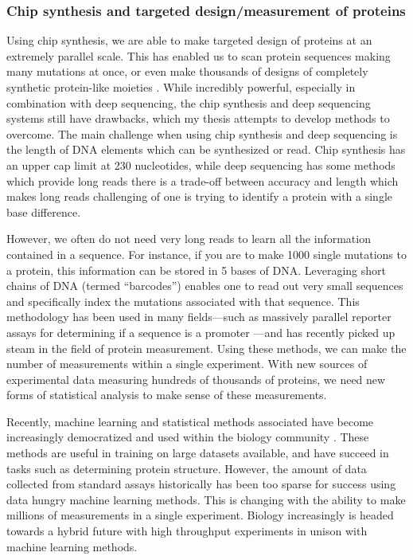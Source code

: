 \subsubsection{Chip synthesis and targeted design/measurement of proteins}
Using chip synthesis, we are able to make targeted design of proteins at an extremely parallel scale. This has enabled us to scan protein sequences making many mutations at once\cite{Starita2015-uk,Taylor2016-wr}, or even make thousands of designs of completely synthetic protein-like moieties \cite{Chevalier2017-zf}. While incredibly powerful, especially in combination with deep sequencing, the chip synthesis and deep sequencing systems still have drawbacks, which my thesis attempts to develop methods to overcome. The main challenge when using chip synthesis and deep sequencing is the length of DNA elements which can be synthesized or read. Chip synthesis has an upper cap limit at 230 nucleotides, while deep sequencing has some methods which provide long reads \cite{Levene2003-xu,Astier2006-bb} there is a trade-off between accuracy and length which makes long reads challenging of one is trying to identify a protein with a single base difference. 

However, we often do not need very long reads to learn all the information contained in a sequence. For instance, if you are to make 1000 single mutations to a protein, this information can be stored in 5 bases of DNA. Leveraging short chains of DNA (termed ``barcodes'') enables one to read out very small sequences and specifically index the mutations associated with that sequence. This methodology has been used in many fields---such as massively parallel reporter assays for determining if a sequence is a promoter \cite{Melnikov2012-oc}---and has recently picked up steam in the field of protein measurement. Using these methods, we can make the number of measurements within a single experiment. With new sources of experimental data measuring hundreds of thousands of proteins, we need new forms of statistical analysis to make sense of these measurements. 

Recently, machine learning and statistical methods associated have become increasingly democratized and used within the biology community \cite{Riesselman2018-gq,Poelwijk2017-uh,Wu2019-cq,Romero2013-nh}. These methods are useful in training on large datasets available, and have succeed in tasks such as determining protein structure\cite{Marks2011-wy}. However, the amount of data collected from standard assays historically has been too sparse for success using data hungry machine learning methods. This is changing with the ability to make millions of measurements in a single experiment. Biology increasingly is headed towards a hybrid future with high throughput experiments in unison with machine learning methods. 

